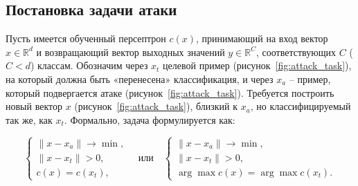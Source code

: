\subsection{Постановка задачи атаки}


Пусть имеется обученный персептрон \(c(x)\), принимающий на вход вектор \(x \in \mathbb{R}^d\) и возвращающий вектор выходных значений \(y \in \mathbb{R}^C\), соответствующих \(C\) (\(C < d\)) классам. Обозначим через \(x_t\) целевой пример (рисунок~\cref{fig:attack_task}), на который должна быть «перенесена» классификация, и через \(x_a\) -- пример, который подвергается атаке (рисунок~\cref{fig:attack_task}). Требуется построить новый вектор \(x\) (рисунок~\cref{fig:attack_task}), близкий к \(x_a\), но классифицируемый так же, как \(x_t\). Формально, задача формулируется как:

\[
\begin{cases}
    \| x - x_a \| \rightarrow \min,\\
    \| x - x_t \| > 0,\\
    c(x) = c(x_t),
\end{cases}
\quad \text{или} \quad
\begin{cases}
    \| x - x_a \| \rightarrow \min,\\
    \| x - x_t \| > 0,\\
    \arg\max c(x) = \arg\max c(x_t).
\end{cases}
\]

